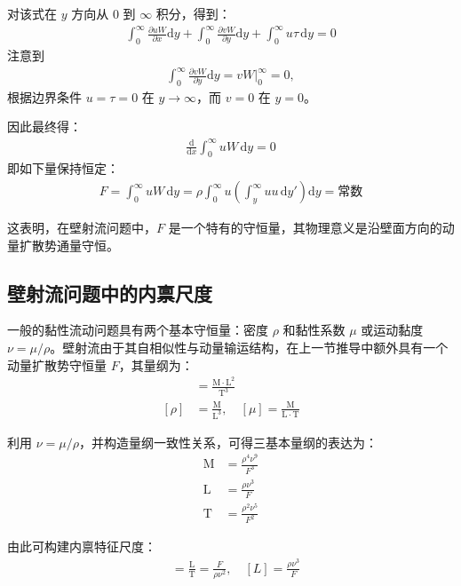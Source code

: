对该式在 $y$ 方向从 $0$ 到 $\infty$ 积分，得到：
\begin{align}
    \int_{0}^{\infty} \frac{\partial uW}{\partial x} \mathrm{d}y + \int_{0}^{\infty} \frac{\partial vW}{\partial y} \mathrm{d}y + \int_{0}^{\infty} u\tau\, \mathrm{d}y = 0
\end{align}
注意到
\begin{align}
    \int_{0}^{\infty} \frac{\partial vW}{\partial y} \mathrm{d}y = vW\big|_{0}^{\infty} = 0,
\end{align}
根据边界条件 $u = \tau = 0$ 在 $y\to\infty$，而 $v = 0$ 在 $y=0$。

因此最终得：
\begin{align}
    \frac{\mathrm{d}}{\mathrm{d}x} \int_{0}^{\infty} uW\, \mathrm{d}y = 0
\end{align}
即如下量保持恒定：
\begin{align}
    F = \int_{0}^{\infty} uW\, \mathrm{d}y = \rho \int_{0}^{\infty} u \left(\int_{y}^{\infty} uu\,\mathrm{d}y'\right) \mathrm{d}y = \text{常数}
\end{align}

这表明，在壁射流问题中，$F$ 是一个特有的守恒量，其物理意义是沿壁面方向的动量扩散势通量守恒。

\subsection{壁射流问题中的内禀尺度}

一般的黏性流动问题具有两个基本守恒量：密度 $\rho$ 和黏性系数 $\mu$ 或运动黏度 $\nu = \mu/\rho$。壁射流由于其自相似性与动量输运结构，在上一节推导中额外具有一个动量扩散势守恒量 $F$，其量纲为：
\begin{align}
    [F] &= \frac{\mathrm{M}\cdot \mathrm{L}^{2}}{\mathrm{T}^{3}} \\
    [\rho] &= \frac{\mathrm{M}}{\mathrm{L}^{3}}, \quad [\mu] = \frac{\mathrm{M}}{\mathrm{L}\cdot \mathrm{T}}
\end{align}

利用 $\nu = \mu/\rho$，并构造量纲一致性关系，可得三基本量纲的表达为：
\begin{align}
    \mathrm{M} &= \frac{\rho^{4} \nu^{9}}{F^{3}} \\
    \mathrm{L} &= \frac{\rho \nu^{3}}{F} \\
    \mathrm{T} &= \frac{\rho^{2} \nu^{5}}{F^{2}}
\end{align}

由此可构建内禀特征尺度：
\begin{align}
    [U] &= \frac{\mathrm{L}}{\mathrm{T}} = \frac{F}{\rho \nu^{2}}, \quad
    [L] = \frac{\rho \nu^{3}}{F}
\end{align}

